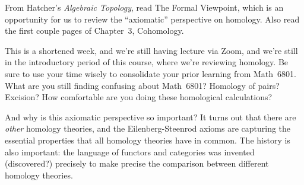 \documentclass{homework}
\author{Jim Fowler}
\date{Week 2: Homology and coefficients}
\begin{document}
\maketitle

From Hatcher's \textit{Algebraic Topology}, read  The
Formal Viewpoint, which is an opportunity for us to review the
``axiomatic'' perspective on homology.  Also read the first couple
pages of Chapter~3, Cohomology.

This is a shortened week, and we're still having lecture via Zoom, and
we're still in the introductory period of this course, where we're
reviewing homology.  Be sure to use your time wisely to consolidate
your prior learning from Math~6801.  What are you still finding
confusing about Math~6801?  Homology of pairs?  Excision?  How
comfortable are you doing these homological calculations?

And why is this axiomatic perspective so important?  It turns out that
there are \textit{other} homology theories, and the Eilenberg-Steenrod
axioms are capturing the essential properties that all homology
theories have in common.  The history is also important: the language
of functors and categories was invented (discovered?) precisely to
make precise the comparison between different homology theories.
\end{document}
